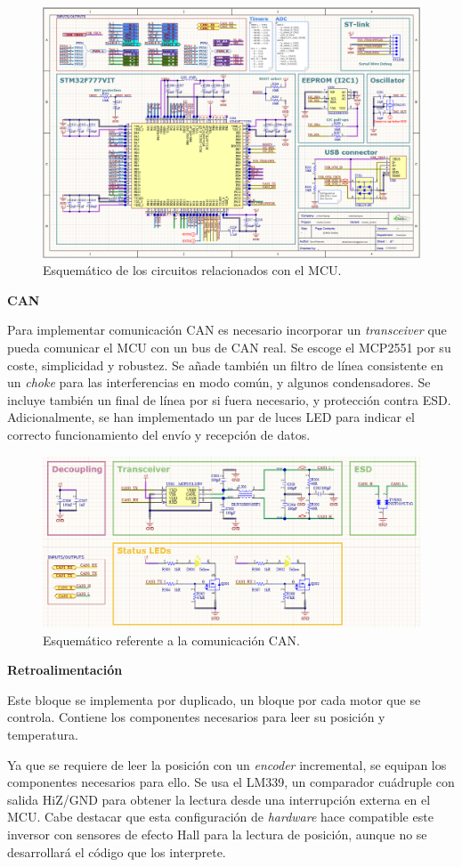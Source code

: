 \begin{figure}[H]
	\centering
	\includegraphics[width=0.7\linewidth]{fig/schMCUcontrol}
	\caption{Esquemático de los circuitos relacionados con el MCU.}
\end{figure}
 
\textbf{CAN}

Para implementar comunicación CAN es necesario incorporar un \textit{transceiver} que pueda comunicar el MCU con un bus de CAN real. Se escoge el MCP2551 por su coste, simplicidad y robustez. Se añade también un filtro de línea consistente en un \textit{choke} para las interferencias en modo común, y algunos condensadores. Se incluye también un final de línea por si fuera necesario, y protección contra ESD. Adicionalmente, se han implementado un par de luces LED para indicar el correcto funcionamiento del envío y recepción de datos.

\begin{figure}[H]
	\centering
	\includegraphics[width=0.7\linewidth]{fig/schCANcontrol}
	\caption{Esquemático referente a la comunicación CAN.}
\end{figure}

\textbf{Retroalimentación}

Este bloque se implementa por duplicado, un bloque por cada motor que se controla. Contiene los componentes necesarios para leer su posición y temperatura.

Ya que se requiere de leer la posición con un \textit{encoder} incremental, se equipan los componentes necesarios para ello. Se usa el LM339, un comparador cuádruple con salida HiZ/GND para obtener la lectura desde una interrupción externa en el MCU. Cabe destacar que esta configuración de \textit{hardware} hace compatible este inversor con sensores de efecto Hall para la lectura de posición, aunque no se desarrollará el código que los interprete.

